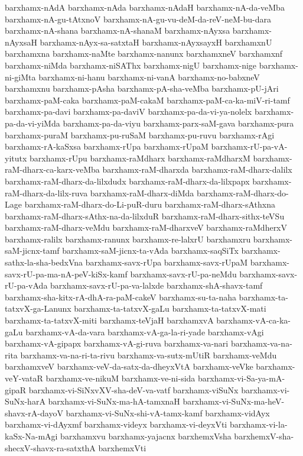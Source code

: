 {barxhamx-nAdA
barxhamx-nAda
barxhamx-nAdaH
barxhamx-nA-da-veMba
barxhamx-nA-gu-tAtxnoV
barxhamx-nA-gu-vu-deM-da-reV-neM-bu-dara
barxhamx-nA-shana
barxhamx-nA-shanaM
barxhamx-nAyxsa
barxhamx-nAyxsaH
barxhamx-nAyx-sa-satxtaH
barxhamx-nAyxsayxH
barxhamxnU
barxhamxna
barxhamx-naMte
barxhamx-nanunx
barxhamxneV
barxhamxnf
barxhamx-niMda
barxhamx-niSAThx
barxhamx-nigU
barxhamx-nige
barxhamx-ni-giMta
barxhamx-ni-hanu
barxhamx-ni-vanA
barxhamx-no-babxneV
barxhamxnu
barxhamx-pAsha
barxhamx-pA-sha-veMba
barxhamx-pU-jAri
barxhamx-paM-caka
barxhamx-paM-cakaM
barxhamx-paM-ca-ka-miV-ri-tamf
barxhamx-pa-davi
barxhamx-pa-daviV
barxhamx-pa-da-vi-ya-nolelx
barxhamx-pa-da-vi-yiMda
barxhamx-pa-da-viyu
barxhamx-parx-saM-gava
barxhamx-pura
barxhamx-puraM
barxhamx-pu-ruSaM
barxhamx-pu-ruvu
barxhamx-rAgi
barxhamx-rA-kaSxsa
barxhamx-rUpa
barxhamx-rUpaM
barxhamx-rU-pa-vA-yitutx
barxhamx-rUpu
barxhamx-raMdharx
barxhamx-raMdharxM
barxhamx-raM-dharx-ca-karx-veMba
barxhamx-raM-dharxda
barxhamx-raM-dharx-dalilx
barxhamx-raM-dharx-da-lilxdudx
barxhamx-raM-dharx-da-lilxpapx
barxhamx-raM-dharx-da-lilx-ruva
barxhamx-raM-dharx-diMda
barxhamx-raM-dharx-do-Lage
barxhamx-raM-dharx-do-Li-puR-duru
barxhamx-raM-dharx-sAthxna
barxhamx-raM-dharx-sAthx-na-da-lilxduR
barxhamx-raM-dharx-sithx-teVSu
barxhamx-raM-dharx-veMdu
barxhamx-raM-dharxveV
barxhamx-raMdherxV
barxhamx-ralilx
barxhamx-ranunx
barxhamx-re-lalxrU
barxhamxru
barxhamx-saM-jicnx-tamf
barxhamx-saM-jicnx-ta-vAda
barxhamx-saqSiTx
barxhamx-sathx-la-sha-bedxVna
barxhamx-savx-rUpa
barxhamx-savx-rUpaM
barxhamx-savx-rU-pa-ma-nA-peV-kiSx-kamf
barxhamx-savx-rU-pa-neMdu
barxhamx-savx-rU-pa-vAda
barxhamx-savx-rU-pa-va-lalxde
barxhamx-shA-shavx-tamf
barxhamx-sha-kitx-rA-dhA-ra-paM-cakeV
barxhamx-su-ta-naha
barxhamx-ta-tatxvX-ga-Lanunx
barxhamx-ta-tatxvX-gaLu
barxhamx-ta-tatxvX-mati
barxhamx-ta-tatxvX-miti
barxhamx-teVjaH
barxhamxvA
barxhamx-vA-ca-ka-gaLu
barxhamx-vA-da-vara
barxhamx-vA-ga-la-ri-yade
barxhamx-vAgi
barxhamx-vA-gipapx
barxhamx-vA-gi-ruva
barxhamx-va-nari
barxhamx-va-na-rita
barxhamx-va-na-ri-ta-rivu
barxhamx-va-sutx-mUtiR
barxhamx-veMdu
barxhamxveV
barxhamx-veV-da-satx-da-dheyxVtA
barxhamx-veVke
barxhamx-veY-vataR
barxhamx-ve-nikuM
barxhamx-ve-ni-sida
barxhamx-vi-Sa-ya-mA-gipaR
barxhamx-vi-SiNxvXV-sha-deV-va-vatf
barxhamx-viSuNx
barxhamx-vi-SuNx-harA
barxhamx-vi-SuNx-ma-hA-tamxnaH
barxhamx-vi-SuNx-ma-heV-shavx-rA-dayoV
barxhamx-vi-SuNx-shi-vA-tamx-kamf
barxhamx-vidAyx
barxhamx-vi-dAyxmf
barxhamx-videyx
barxhamx-vi-deyxVti
barxhamx-vi-la-kaSx-Na-mAgi
barxhamxvu
barxhamx-yajacnx
barxhemxVsha
barxhemxV-sha-shecxV-shavx-ra-satxthA
barxhemxVti
}
